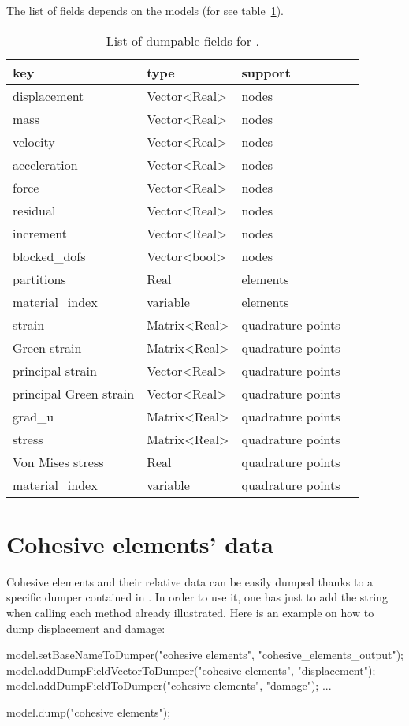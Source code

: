 The list of fields depends on the models (for
 see table~\ref{tab:io:smm_field_list}).

\begin{table}
  \centering
  \begin{tabular}{llll}
    \toprule
    key          &    type      & support \\
    \midrule
    displacement & Vector<Real> & nodes  \\
    mass         & Vector<Real> & nodes  \\
    velocity     & Vector<Real> & nodes  \\
    acceleration & Vector<Real> & nodes  \\
    force	       & Vector<Real> & nodes  \\
    residual     & Vector<Real> & nodes  \\
    increment     & Vector<Real> & nodes  \\
    {blocked\_dofs}  & Vector<bool> & nodes  \\    
    partitions   & Real         & elements \\
    material\_index & variable  & elements\\    
    strain & Matrix<Real> & quadrature points  \\
    Green strain & Matrix<Real> & quadrature points  \\
    principal strain & Vector<Real> & quadrature points  \\
    principal Green strain & Vector<Real> & quadrature points  \\
    grad\_u & Matrix<Real> & quadrature points  \\    
    stress & Matrix<Real> & quadrature points  \\
    Von Mises stress & Real & quadrature points  \\        
    material\_index & variable  & quadrature points \\
    \bottomrule
  \end{tabular}
  \caption{List of dumpable fields for .}
  \label{tab:io:smm_field_list}
\end{table}

\section{Cohesive elements' data}
Cohesive elements and their relative data can be easily dumped thanks
to a specific dumper contained in
. In order to use it, one has just
to add the string  when calling each method
already illustrated. Here is an example on how to dump displacement
and damage:
\begin{cpp}
  model.setBaseNameToDumper("cohesive elements", "cohesive_elements_output");
  model.addDumpFieldVectorToDumper("cohesive elements", "displacement");
  model.addDumpFieldToDumper("cohesive elements", "damage");
  ...

  model.dump("cohesive elements");
\end{cpp}


